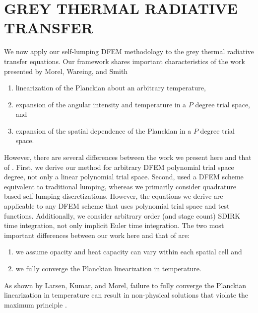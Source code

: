 %
%
%



\chapter{\uppercase{Grey Thermal Radiative Transfer}}
\label{sec:chapter6_grey_radtran}

We now apply our self-lumping DFEM methodology to the grey thermal radiative transfer equations.
Our framework shares important characteristics of the work presented by Morel, Wareing, and Smith \cite{morel_radtran}
\begin{enumerate}
\item linearization of the Planckian about an arbitrary temperature,
\item  expansion of the angular intensity and temperature in a $P$ degree trial space, and
\item expansion of the spatial dependence of the Planckian in a $P$ degree trial space.
\end{enumerate}
However, there are several differences between the work we present here and that of \cite{morel_radtran}.
First, we derive our method for arbitrary DFEM polynomial trial space degree, not only a linear polynomial trial space.
Second, \cite{morel_radtran} used a DFEM scheme equivalent to traditional lumping, whereas we primarily consider quadrature based self-lumping discretizations.
However, the equations we derive are applicable to any DFEM scheme that uses polynomial trial space and test functions.
Additionally, we consider arbitrary order (and stage count) SDIRK time integration, not only implicit Euler time integration.
The two most important differences between our work here and that of \cite{morel_radtran} are:
\begin{enumerate}
\item we assume opacity and heat capacity can vary within each spatial cell and
\item we fully converge the Planckian linearization in temperature.
\end{enumerate}
As shown by Larsen, Kumar, and Morel, failure to fully converge the Planckian linearization in temperature can result in non-physical solutions that violate the maximum principle \cite{larsen_trt}.

